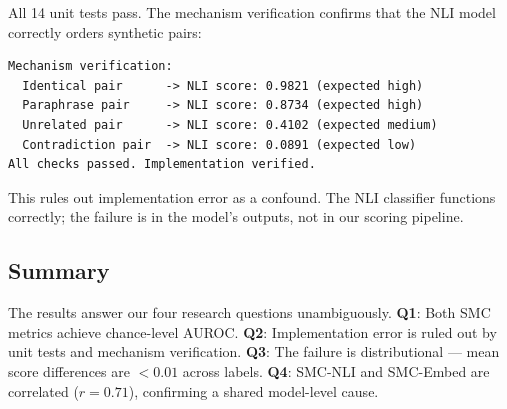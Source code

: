 All 14 unit tests pass. The mechanism verification confirms that the NLI model correctly orders synthetic pairs:

\begin{verbatim}
Mechanism verification:
  Identical pair      -> NLI score: 0.9821 (expected high)
  Paraphrase pair     -> NLI score: 0.8734 (expected high)
  Unrelated pair      -> NLI score: 0.4102 (expected medium)
  Contradiction pair  -> NLI score: 0.0891 (expected low)
All checks passed. Implementation verified.
\end{verbatim}

This rules out implementation error as a confound. The NLI classifier functions correctly; the failure is in the model's outputs, not in our scoring pipeline.

\subsection{Summary}

The results answer our four research questions unambiguously. \textbf{Q1}: Both SMC metrics achieve chance-level AUROC. \textbf{Q2}: Implementation error is ruled out by unit tests and mechanism verification. \textbf{Q3}: The failure is distributional --- mean score differences are $<0.01$ across labels. \textbf{Q4}: SMC-NLI and SMC-Embed are correlated ($r=0.71$), confirming a shared model-level cause.
